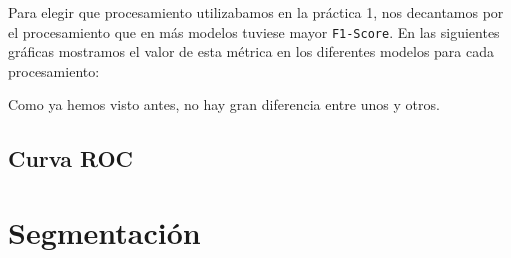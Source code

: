 \documentclass[a4]{article}
\begin{document}
Para elegir que procesamiento utilizabamos en la práctica 1, nos decantamos por el procesamiento que en más modelos tuviese mayor \texttt{F1-Score}. En las siguientes gráficas mostramos el valor de esta métrica en los diferentes modelos para cada procesamiento: 

\begin{figure}[H]
  \centering
\end{figure}

\begin{figure}[H]
  \centering
\end{figure}

Como ya hemos visto antes, no hay gran diferencia entre unos y otros. 

\subsection{Curva ROC}

\begin{figure}[H]
  \centering
\end{figure}

\section{Segmentación}
\end{document}
